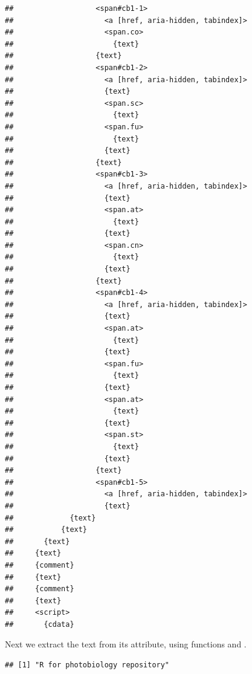 \documentclass[krantz2]{krantz}\usepackage{knitr}
\begin{document}
\begin{knitrout}
\begin{kframe}
\begin{verbatim}
##                   <span#cb1-1>
##                     <a [href, aria-hidden, tabindex]>
##                     <span.co>
##                       {text}
##                   {text}
##                   <span#cb1-2>
##                     <a [href, aria-hidden, tabindex]>
##                     {text}
##                     <span.sc>
##                       {text}
##                     <span.fu>
##                       {text}
##                     {text}
##                   {text}
##                   <span#cb1-3>
##                     <a [href, aria-hidden, tabindex]>
##                     {text}
##                     <span.at>
##                       {text}
##                     {text}
##                     <span.cn>
##                       {text}
##                     {text}
##                   {text}
##                   <span#cb1-4>
##                     <a [href, aria-hidden, tabindex]>
##                     {text}
##                     <span.at>
##                       {text}
##                     {text}
##                     <span.fu>
##                       {text}
##                     {text}
##                     <span.at>
##                       {text}
##                     {text}
##                     <span.st>
##                       {text}
##                     {text}
##                   {text}
##                   <span#cb1-5>
##                     <a [href, aria-hidden, tabindex]>
##                     {text}
##             {text}
##           {text}
##       {text}
##     {text}
##     {comment}
##     {text}
##     {comment}
##     {text}
##     <script>
##       {cdata}
\end{verbatim}
\end{kframe}
\end{knitrout}

Next we extract the text from its  attribute, using functions  and .

\begin{knitrout}\footnotesize
{}\color{fgcolor}\begin{kframe}
\begin{alltt}
\hlstd{(} \hlstd{))}
\end{alltt}
\begin{verbatim}
## [1] "R for photobiology repository"
\end{verbatim}
\end{kframe}
\end{knitrout}
\end{document}
